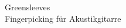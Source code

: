 \documentclass{article}
\begin{document}
\begin{center}
  {\Large Greensleeves}\\[1ex]
  Fingerpicking f\"ur Akustikgitarre
\end{center}

\end{document}
